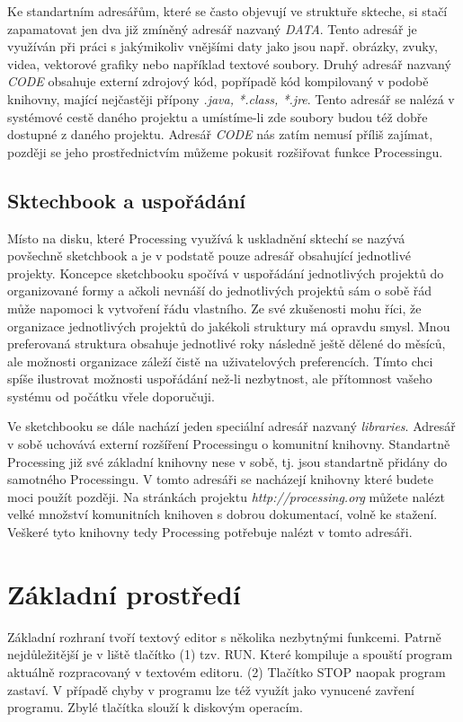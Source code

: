 \documentclass[11pt]{book}
\newcommand{\oddil}[1]{\section{#1}\label{sec:#1}}
\newcommand{\pododdil}[1]{\subsection{#1}\label{subsec:#1}}
\begin{document}
Ke standartním adresářům, které se často objevují ve struktuře skteche, si stačí zapamatovat jen dva již zmíněný adresář nazvaný {\em DATA}. Tento adresář je využíván při práci s jakýmikoliv vnějšími daty jako jsou např. obrázky, zvuky, videa, vektorové grafiky nebo například textové soubory. Druhý adresář nazvaný {\em CODE} obsahuje externí zdrojový kód, popřípadě kód kompilovaný v podobě knihovny, mající nejčastěji přípony {\em *.java, *.class, *.jre}. Tento adresář se nalézá v systémové cestě daného projektu a umístíme-li zde soubory budou též dobře dostupné z daného projektu. Adresář {\em CODE} nás zatím nemusí příliš zajímat, později se jeho prostřednictvím můžeme pokusit rozšiřovat funkce Processingu.


\pododdil{Sktechbook a uspořádání}

Místo na disku, které Processing využívá k uskladnění sktechí se nazývá povšechně sketchbook a je v podstatě pouze adresář obsahující jednotlivé projekty. Koncepce sketchbooku spočívá v uspořádání jednotlivých projektů do organizované formy a ačkoli nevnáší do jednotlivých projektů sám o sobě řád může napomoci k vytvoření řádu vlastního. Ze své zkušenosti mohu říci, že organizace jednotlivých projektů do jakékoli struktury má opravdu smysl. Mnou preferovaná struktura obsahuje jednotlivé roky následně ještě dělené do měsíců, ale možnosti organizace záleží čistě na uživatelových preferencích. Tímto chci spíše ilustrovat možnosti uspořádání než-li nezbytnost, ale přítomnost vašeho systému od počátku vřele doporučuji.

Ve sketchbooku se dále nachází jeden speciální adresář nazvaný {\em libraries}. Adresář v sobě uchovává externí rozšíření Processingu o komunitní knihovny. Standartně Processing již své základní knihovny nese v sobě, tj. jsou standartně přidány do samotného Processingu. V tomto adresáři se nacházejí knihovny které budete moci použít později. Na stránkách projektu {\em http://processing.org} můžete nalézt velké množství komunitních knihoven s dobrou dokumentací, volně ke stažení. Veškeré tyto knihovny tedy Processing potřebuje nalézt v tomto adresáři.


\oddil{Základní prostředí}


Základní rozhraní tvoří textový editor s několika nezbytnými funkcemi. Patrně nejdůležitější je v liště tlačítko (1) tzv. RUN. Které kompiluje a spouští program aktuálně rozpracovaný v textovém editoru. (2) Tlačítko STOP naopak program zastaví. V případě chyby v programu lze též využít jako vynucené zavření programu. Zbylé tlačítka slouží k diskovým operacím. \\
\end{document}
